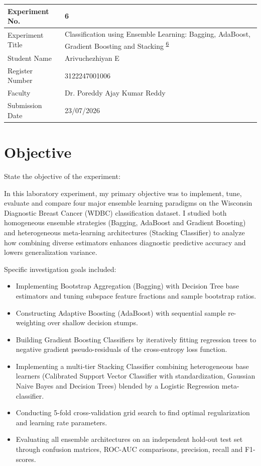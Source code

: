 \documentclass[12pt,a4paper]{article}
\begin{document}

\begin{tabular}{|p{4cm}|p{11cm}|}
\hline
Experiment No. & 6 \\ \hline
Experiment Title & Classification using Ensemble Learning: Bagging, AdaBoost, Gradient Boosting and Stacking \textsuperscript{\href{https://github.com/arivuchezhiyan/Machine_Learning/tree/main/experiment_6}{6}} \\ \hline
Student Name & Arivuchezhiyan E \\ \hline
Register Number & 3122247001006 \\ \hline
Faculty & Dr. Poreddy Ajay Kumar Reddy \\ \hline
Submission Date & 23/07/2026 \\ \hline
\end{tabular}

\vspace{0.5cm}

\section{Objective}
State the objective of the experiment:

In this laboratory experiment, my primary objective was to implement, tune, evaluate and compare four major ensemble learning paradigms on the Wisconsin Diagnostic Breast Cancer (WDBC) classification dataset. I studied both homogeneous ensemble strategies (Bagging, AdaBoost and Gradient Boosting) and heterogeneous meta-learning architectures (Stacking Classifier) to analyze how combining diverse estimators enhances diagnostic predictive accuracy and lowers generalization variance.

Specific investigation goals included:
\begin{itemize}
\item Implementing Bootstrap Aggregation (Bagging) with Decision Tree base estimators and tuning subspace feature fractions and sample bootstrap ratios.
\item Constructing Adaptive Boosting (AdaBoost) with sequential sample re-weighting over shallow decision stumps.
\item Building Gradient Boosting Classifiers by iteratively fitting regression trees to negative gradient pseudo-residuals of the cross-entropy loss function.
\item Implementing a multi-tier Stacking Classifier combining heterogeneous base learners (Calibrated Support Vector Classifier with standardization, Gaussian Naive Bayes and Decision Trees) blended by a Logistic Regression meta-classifier.
\item Conducting 5-fold cross-validation grid search to find optimal regularization and learning rate parameters.
\item Evaluating all ensemble architectures on an independent hold-out test set through confusion matrices, ROC-AUC comparisons, precision, recall and F1-scores.
\end{itemize}
\end{document}
